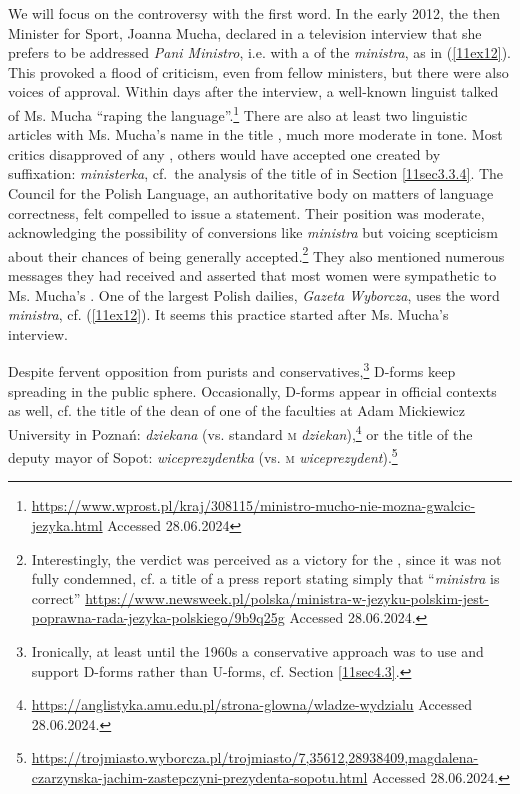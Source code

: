 \documentclass[output=paper,colorlinks,citecolor=brown]{langscibook}
\begin{document}
We will focus on the controversy with the first word. In the early 2012, the then Minister for Sport, Joanna Mucha, declared in a television interview that she prefers to be addressed \emph{Pani Ministro}, i.e. with a  of the  \emph{ministra}, as in (\ref{11ex12}). This provoked a flood of criticism, even from fellow ministers, but there were also voices of approval. Within days after the interview, a well-known linguist talked of Ms. Mucha ``raping the language''.\footnote{\url{https://www.wprost.pl/kraj/308115/ministro-mucho-nie-mozna-gwalcic-jezyka.html} \newline Accessed 28.06.2024\label{11ftn33}} There are also at least two linguistic articles with Ms. Mucha's name in the title \citep{bobrowski2012, waszakowa2014}, much more moderate in tone. Most critics disapproved of any , others would have accepted one created by suffixation: \emph{ministerka}, cf.~the analysis of the title of \citet{szpyra-kozlowska2019} in Section \ref{11sec3.3.4}. The Council for the Polish Language, an authoritative body on matters of language correctness, felt compelled to issue a statement. Their position \citep{rjp2012} was moderate, acknowledging the possibility of conversions like \emph{ministra} but voicing scepticism about their chances of being generally accepted.\footnote{Interestingly, the verdict was perceived as a victory for the , since it was not fully condemned, cf. a title of a press report stating simply that ``\emph{ministra} is correct'' \url{https://www.newsweek.pl/polska/ministra-w-jezyku-polskim-jest-poprawna-rada-jezyka-polskiego/9b9q25g}	Accessed 28.06.2024.} They also mentioned numerous messages they had received and asserted that most women were sympathetic to Ms. Mucha's . One of the largest Polish dailies, \emph{Gazeta Wyborcza}, uses the word \emph{ministra}, cf. (\ref{11ex12}). It seems this practice started after Ms. Mucha's interview.

Despite fervent opposition from purists and conservatives,\footnote{Ironically, at least until the 1960s a conservative approach was to use and support D-forms rather than U-forms, cf. Section \ref{11sec4.3}.} D-forms keep spreading in the public sphere. Occasionally, D-forms appear in official contexts as well, cf. the title of the dean of one of the faculties at Adam Mickiewicz University in Poznań: \emph{dziekana} (vs. standard \textsc{m} \emph{dziekan}),\footnote{\url{https://anglistyka.amu.edu.pl/strona-glowna/wladze-wydzialu} Accessed 28.06.2024.} or the title of the deputy mayor of Sopot: \emph{wiceprezydentka} (vs. \textsc{m} \emph{wiceprezydent}).\footnote{\url{https://trojmiasto.wyborcza.pl/trojmiasto/7,35612,28938409,magdalena-czarzynska-jachim-zastepczyni-prezydenta-sopotu.html} Accessed 28.06.2024.}
\end{document}
